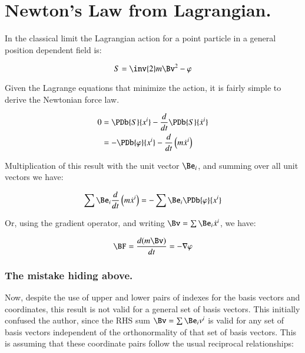 \chapter{Newton's Law from Lagrangian.}
\label{chap:newtonianLagrangianAndGradient}
\date{August 9, 2008.  $RCSfile: newtonianLagrangianAndGradient.tex,v $ Last $Revision: 1.8 $ $Date: 2009/06/14 17:59:59 $ }

In the classical limit the Lagrangian action for a point particle in a general
position dependent field is:

\begin{equation}
S = \inv{2} m\Bv^2 - \varphi
\end{equation}

Given the Lagrange equations that minimize the action, it is fairly simple
to derive the Newtonian force law.

\begin{align*}
0
&= \PDb{S}{x^i} - \frac{d}{dt}\PDb{S}{\dot{x}^i} \\
&= -\PDb{\varphi}{x^i} - \frac{d}{dt}\left(m \dot{x}^i\right)
\end{align*}

Multiplication of this result with the unit vector $\Be_i$, and summing over
all unit vectors we have:

\begin{equation*}
\sum \Be_i \frac{d}{dt}\left(m \dot{x}^i\right) = - \sum \Be_i \PDb{\varphi}{x^i}
\end{equation*}

Or, using the gradient operator, and writing $\Bv = \sum \Be_i \dot{x}^i$, we have:

\begin{equation}
\BF = \frac{d (m \Bv)}{dt} = - \grad \varphi
\end{equation}

\subsection{The mistake hiding above. }

Now, despite the use of upper and lower pairs of indexes for the basis vectors and coordinates, this
result is not valid for a general set of basis vectors.  This initially confused the author, since the RHS
sum $\Bv = \sum \Be_i v^i$ is valid for any set of basis vectors independent of the orthonormality of that
set of basis vectors.  This is assuming that these coordinate pairs follow the usual reciprocal relationships:

